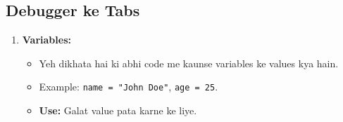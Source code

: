 \documentclass[a4paper,12pt]{article}
\begin{document}
\subsection{Debugger ke Tabs}
\begin{enumerate}
    \item \textbf{\color{myblue}Variables:}  
    \begin{itemize}
        \item Yeh dikhata hai ki abhi code me kaunse variables ke values kya hain.
        \item Example: \texttt{\color{mygreen}name = "John Doe"}, \texttt{\color{mygreen}age = 25}.
        \item \textbf{\color{myblue}Use:} Galat value pata karne ke liye.
    \end{itemize}


\end{enumerate}
\end{document}
